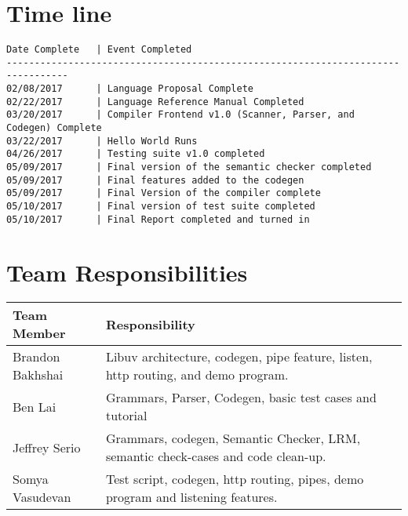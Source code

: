 \documentclass[./Report_main.tex]{subfiles}
\begin{document}
\section{Time line}
\begin{lstlisting} 
Date Complete	| Event Completed
---------------------------------------------------------------------------------
02/08/2017		| Language Proposal Complete
02/22/2017		| Language Reference Manual Completed
03/20/2017		| Compiler Frontend v1.0 (Scanner, Parser, and Codegen) Complete
03/22/2017		| Hello World Runs
04/26/2017		| Testing suite v1.0 completed
05/09/2017		| Final version of the semantic checker completed
05/09/2017		| Final features added to the codegen
05/09/2017		| Final Version of the compiler complete
05/10/2017		| Final version of test suite completed
05/10/2017		| Final Report completed and turned in
\end{lstlisting}
\section{Team Responsibilities}
\begin{tabu} to 1\textwidth { | X[c] | X[c] | }
 \hline
 Team Member & Responsibility \\ 
 \hline
 Brandon Bakhshai & Libuv architecture, codegen, pipe feature, listen, http routing, and demo program.
\\
 \hline
Ben Lai  & Grammars, Parser, Codegen, basic test cases and tutorial\\
 \hline
Jeffrey Serio  & Grammars, codegen, Semantic Checker, LRM, semantic check-cases and code clean-up.
\\
\hline
Somya Vasudevan & Test script, codegen, http routing, pipes, demo program and listening features.\\
\hline
\end{tabu}
\end{document}
